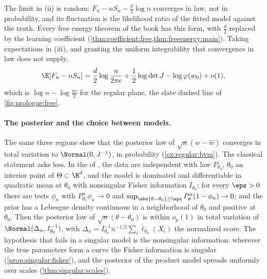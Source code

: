 \begin{refsection}
The limit in (ii) is random: $F_n-nS_n-\frac d2\log n$ converges in law, not in probability, and its fluctuation is the likelihood ratio of the fitted model against the truth. Every free energy theorem of the book has this form, with $\frac d2$ replaced by the learning coefficient (\cref{thm:coefficient:free,thm:freeenergy:main}). Taking expectations in (iii), and granting the uniform integrability that convergence in law does not supply,
\begin{equation}\label{eq:regular:meanF}
\E[F_n-nS_n]=\frac d2\log\frac n{2\pi e}+\frac12\log\det J-\log\varphi(w_0)+o(1),
\end{equation}
which is $\log n-\log\frac{\pi e}2$ for the regular plane, the slate dashed line of \cref{fig:prologue:free}.

\paragraph{The posterior and the choice between models.} The same three regions show that the posterior law of $\sqrt n(w-\hat w)$ converges in total variation to $\Normal(0,J^{-1})$, in probability (\cref{ex:regular:bvm}). The classical statement asks less. In the  of \textcite[Theorem~10.1]{vanderVaart1998}, the data are independent with law $P_{\theta_0}$, $\theta_0$ an interior point of $\Theta\subset\R^d$, and the model is dominated and differentiable in quadratic mean at $\theta_0$ with nonsingular Fisher information $I_{\theta_0}$; for every $\eps>0$ there are tests $\phi_n$ with $P^n_{\theta_0}\phi_n\to0$ and $\sup_{\abs{\theta-\theta_0}\ge\eps}P^n_\theta(1-\phi_n)\to0$; and the prior has a Lebesgue density continuous in a neighborhood of $\theta_0$ and positive at $\theta_0$. Then the posterior law of $\sqrt n(\theta-\theta_0)$ is within $o_p(1)$ in total variation of $\Normal(\Delta_n,I_{\theta_0}^{-1})$, with $\Delta_n=I_{\theta_0}^{-1}n^{-1/2}\sum_i\dot\ell_{\theta_0}(X_i)$ the normalized score. The hypothesis that fails in a singular model is the nonsingular information: wherever the true parameters form a curve the Fisher information is singular (\cref{prop:singular:fisher}), and the posterior of the product model spreads uniformly over scales (\cref{thm:singular:scales}).


\end{refsection}
